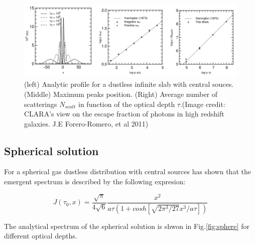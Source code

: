 \begin{figure}[H]\label{fig:slab}
\begin{center}
\includegraphics[scale=0.4]{../Figures/slab.png}
\end{center}\caption{(left) Analytic profile for a dustless infinite slab with central
\ly souces. (Middle) Maximum peaks position. (Right) Average number of 
scatterings $N_{scatt}$ in function of the optical depth $\tau$.(Image credit:  CLARA's view on the escape fraction of \ly photons in high redshift galaxies. J.E Forero-Romero, et al 2011)}
\end{figure}

\subsection{Spherical solution}

For a spherical gas dustless distribution with central \ly sources \citep{Dijkstra06} has shown that the emergent spectrum is described by the following expresion:

\begin{equation}
J(\tau_0, x) = \dfrac{\sqrt{\pi}}{4\sqrt{6}}\dfrac{x^2}{a\tau (1+cosh[\sqrt{2\pi^3/27}x^3/a\tau])}
\end{equation}

The analytical spectrum of the spherical solution 
is shwon in Fig.\ref{fig:sphere} for different optical depths. 

